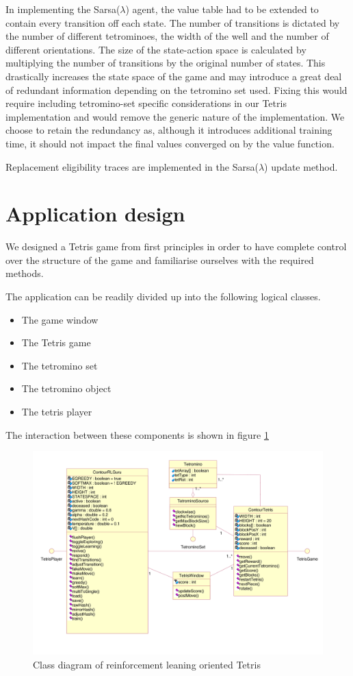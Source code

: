 \documentclass{rucsthesis}
\begin{document}
In implementing the Sarsa($\lambda$) agent, the value table had to be extended to contain every transition off each state. The number of transitions is dictated by the number of different tetrominoes, the width of the well and the number of different orientations.  The size of the state-action space is calculated by multiplying the number of transitions by the original number of states. This drastically increases the state space of the game and may introduce a great deal of redundant information depending on the tetromino set used. Fixing this would require including tetromino-set specific considerations in our Tetris implementation and would remove the generic nature of the implementation. We choose to retain the redundancy as, although it introduces additional training time, it should not impact the final values converged on by the value function.

Replacement eligibility traces are implemented in the Sarsa($\lambda$) update method. 

\section{Application design}

We designed a Tetris game from first principles in order to have complete control over the structure of the game and familiarise ourselves with the required methods.

The application can be readily divided up into the following logical classes.

\begin{itemize}
\item{The game window}
\item{The Tetris game}
\item{The tetromino set}
\item{The tetromino object}
\item{The tetris player}
\end{itemize}

The interaction between these components is shown in figure \ref{fig:uml}

\begin{figure}[h]
\centering
\includegraphics[width=6in]{finaluml.png}
\caption{Class diagram of reinforcement leaning oriented Tetris}
\label{fig:uml}
\end{figure}
\end{document}
